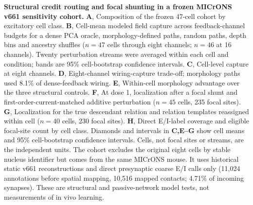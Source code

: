 \textbf{Structural credit routing and focal shunting in a frozen MICrONS v661 sensitivity cohort.}
\textbf{A}, Composition of the frozen 47-cell cohort by excitatory cell class.
\textbf{B}, Cell-mean modeled field capture across feedback-channel budgets for a dense PCA oracle, morphology-defined paths, random paths, depth bins and ancestry shuffles ($n=47$ cells through eight channels; $n=46$ at 16 channels). Twenty perturbation streams were averaged within each cell and condition; bands are 95\% cell-bootstrap confidence intervals.
\textbf{C}, Cell-level capture at eight channels.
\textbf{D}, Eight-channel wiring-capture trade-off; morphology paths used 8.1\% of dense-feedback wiring.
\textbf{E}, Within-cell morphology advantage over the three structural controls.
\textbf{F}, At dose 1, localization after a focal shunt and first-order-current-matched additive perturbation ($n=45$ cells, 235 focal sites).
\textbf{G}, Localization for the true descendant relation and relation templates reassigned within cell ($n=40$ cells, 230 focal sites).
\textbf{H}, Direct E/I-label coverage and eligible focal-site count by cell class. Diamonds and intervals in \textbf{C,E--G} show cell means and 95\% cell-bootstrap confidence intervals. Cells, not focal sites or streams, are the independent units. The cohort excludes the original eight cells by stable nucleus identifier but comes from the same MICrONS mouse. It uses historical static v661 reconstructions and direct presynaptic coarse E/I calls only (11,024 annotations before spatial mapping, 10,516 mapped contacts; 4.71\% of incoming synapses). These are structural and passive-network model tests, not measurements of in vivo learning.


